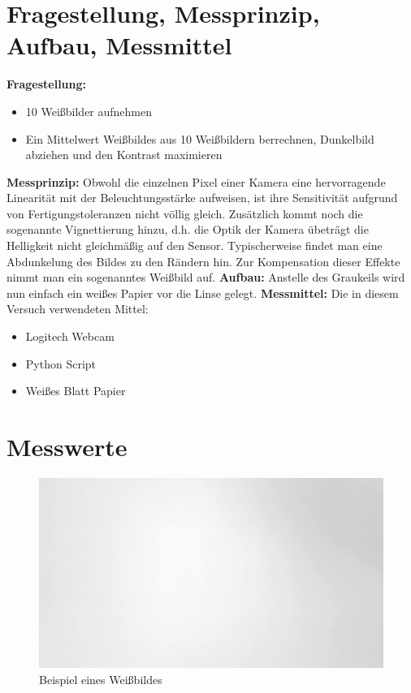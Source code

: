 \documentclass[12pt, oneside, a4paper, \docLanguage]{report}
\begin{document}
\section{Fragestellung, Messprinzip, Aufbau, Messmittel}
\label{chap:VERSUCH_3_FRAGESTELLUNG}

\begin{normalsize}
\textbf{Fragestellung:}
\begin{itemize}
\item 10 Weißbilder aufnehmen
\item Ein Mittelwert Weißbildes aus 10 Weißbildern berrechnen, Dunkelbild abziehen und den Kontrast maximieren
\end{itemize}
\textbf{Messprinzip:}\newline
Obwohl die einzelnen Pixel einer Kamera eine hervorragende Linearität mit der Beleuchtungsstärke aufweisen, ist ihre Sensitivität aufgrund von Fertigungstoleranzen nicht völlig
gleich. Zusätzlich kommt noch die sogenannte Vignettierung hinzu, d.h. die Optik der Kamera
übeträgt die Helligkeit nicht gleichmäßig auf den Sensor. Typischerweise findet man eine
Abdunkelung des Bildes zu den Rändern hin. Zur Kompensation dieser Effekte nimmt man
ein sogenanntes Weißbild auf.\newline
\textbf{Aufbau:}\newline
Anstelle des Graukeils wird nun einfach ein weißes Papier vor die Linse gelegt.\newline
\textbf{Messmittel:}\newline
Die in diesem Versuch verwendeten Mittel:
\begin{itemize}
\item Logitech Webcam
\item Python Script
\item Weißes Blatt Papier
\end{itemize}
\end{normalsize}

\section{Messwerte}
\label{chap:VERSUCH_3_MESSWERTE}
\begin{figure}[H]
\centering
\includegraphics[scale=0.5]{WhiteImages/White3.png}
\caption{Beispiel eines Weißbildes}
\end{figure}
\end{document}
